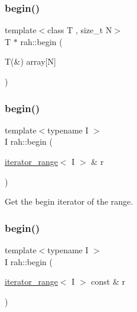 \subsubsection{\texorpdfstring{begin()}{begin()}\hspace{0.1cm}{\footnotesize\ttfamily [1/3]}}
{\footnotesize\ttfamily template$<$class T , size\+\_\+t N$>$ \\
T $\ast$ rah\+::begin (\begin{DoxyParamCaption}\item[{T(\&)}]{array\mbox{[}\+N\mbox{]} }\end{DoxyParamCaption})}

\mbox{\label{namespacerah_a2c4a19e57cc4e0753e93830f247def6d}} 
\subsubsection{\texorpdfstring{begin()}{begin()}\hspace{0.1cm}{\footnotesize\ttfamily [2/3]}}
{\footnotesize\ttfamily template$<$typename I $>$ \\
I rah\+::begin (\begin{DoxyParamCaption}\item[{\mbox{\hyperlink{structrah_1_1iterator__range}{iterator\+\_\+range}}$<$ I $>$ \&}]{r }\end{DoxyParamCaption})}



Get the begin iterator of the range. 

\mbox{\label{namespacerah_a14e69321e6772651b349cb31467ea3a2}} 
\subsubsection{\texorpdfstring{begin()}{begin()}\hspace{0.1cm}{\footnotesize\ttfamily [3/3]}}
{\footnotesize\ttfamily template$<$typename I $>$ \\
I rah\+::begin (\begin{DoxyParamCaption}\item[{\mbox{\hyperlink{structrah_1_1iterator__range}{iterator\+\_\+range}}$<$ I $>$ const \&}]{r }\end{DoxyParamCaption})}



